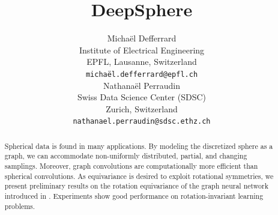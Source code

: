 \documentclass{article} %
\title{DeepSphere}
\author{Michaël Defferrard \\
Institute of Electrical Engineering \\
EPFL, Lausanne, Switzerland \\
\texttt{michaël.defferrard@epfl.ch} \\
\And
Nathanaël Perraudin \\
Swiss Data Science Center (SDSC) \\
Zurich, Switzerland \\
\texttt{nathanael.perraudin@sdsc.ethz.ch} \\
}
\newcommand{\1}{\b{1}}              %
\newcommand{\0}{\b{0}}              %
\begin{document}
\maketitle

\begin{abstract}
	Spherical data is found in many applications.
	By modeling the discretized sphere as a graph, we can accommodate non-uniformly distributed, partial, and changing samplings.
	Moreover, graph convolutions are computationally more efficient than spherical convolutions.
	As equivariance is desired to exploit rotational symmetries, we present preliminary results on the rotation equivariance of the graph neural network introduced in \citet{defferrard2016convolutional}.
	Experiments show good performance on rotation-invariant learning problems.
\end{abstract}
\end{document}
